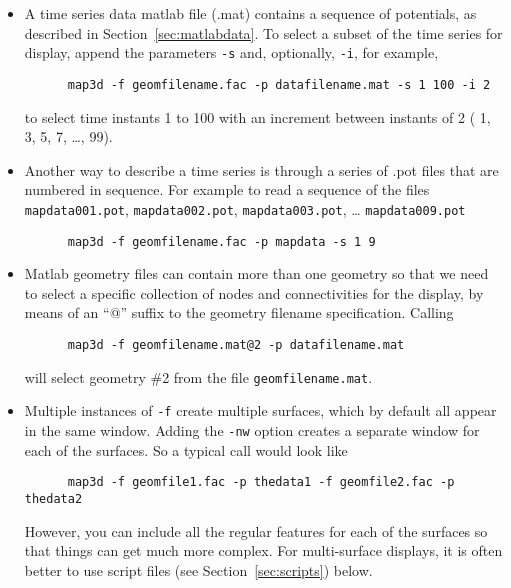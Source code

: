 \begin{itemize}
  \item A time series data matlab file (.mat) contains a sequence of 
  potentials, as described in Section~\ref{sec:matlabdata}.
  To select a subset of the time series for display, append the 
  parameters \texttt{-s} and, optionally,  \texttt{-i}, for example,
  \begin{verbatim}
      map3d -f geomfilename.fac -p datafilename.mat -s 1 100 -i 2
  \end{verbatim}
  \vspace{-.2in}
  to select time instants 1 to 100 with an increment between instants 
  of 2 (\ie{} 1, 3, 5, 7, \ldots, 99).  

  \item Another way to describe a time series is through a series of .pot
  files that are numbered in sequence.  For example to read a sequence of
  the files \texttt{mapdata001.pot}, \texttt{mapdata002.pot},
  \texttt{mapdata003.pot}, \ldots{}  \texttt{mapdata009.pot}
  \begin{verbatim}
      map3d -f geomfilename.fac -p mapdata -s 1 9 
  \end{verbatim}
  
  \item Matlab geometry files can contain more than one geometry 
  so that we need to select a specific collection of nodes and 
  connectivities for the display, by means of an ``@'' suffix to the 
  geometry filename specification.  Calling 
  \begin{verbatim}
      map3d -f geomfilename.mat@2 -p datafilename.mat
  \end{verbatim}
  \vspace{-.2in}
  will select geometry \#2 from the file \texttt{geomfilename.mat}.

  \item Multiple instances of \texttt{-f} create multiple surfaces, which by
  default all appear in the same  window.  Adding the \texttt{-nw} option
  creates a separate window for each of the surfaces.  So a typical call
  would look like
  \begin{verbatim}
      map3d -f geomfile1.fac -p thedata1 -f geomfile2.fac -p thedata2 
  \end{verbatim}
  However, you can include all the regular features for each of the
  surfaces so that things can get much more complex.  For multi-surface
  displays, it is often better to use script files (see
  Section~\ref{sec:scripts}) below.

\end{itemize}

